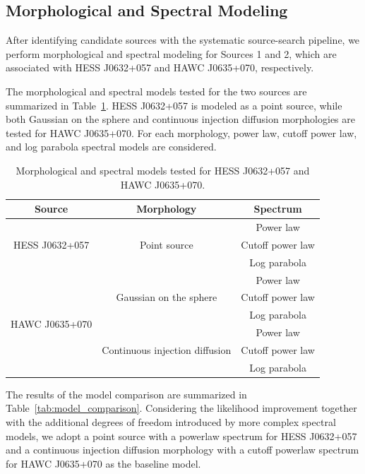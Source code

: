 \documentclass[10pt,letter]{article}
\begin{document}
\subsection{Morphological and Spectral Modeling}
After identifying candidate sources with the systematic source-search
pipeline, we perform morphological and spectral modeling for Sources 1
and 2, which are associated with HESS J0632+057 and HAWC J0635+070,
respectively.

The morphological and spectral models tested for the two sources are
summarized in Table~\ref{tab:tested_models}. HESS J0632+057 is modeled
as a point source, while both Gaussian on the sphere and continuous
injection diffusion morphologies are tested for HAWC J0635+070.
For each morphology, power law, cutoff power law, and log parabola
spectral models are considered.
\begin{table}[H]
\centering
\caption{Morphological and spectral models tested for HESS J0632+057
and HAWC J0635+070.}
\label{tab:tested_models}
\renewcommand{\arraystretch}{1.3}
\begin{tabular}{c|c|c}
\hline
\textbf{Source} & \textbf{Morphology} & \textbf{Spectrum} \\
\hline

\multirow{3}{*}{HESS J0632+057}
& \multirow{3}{*}{Point source}
& Power law \\
& & Cutoff power law \\
& & Log parabola \\
\hline

\multirow{6}{*}{HAWC J0635+070}
& \multirow{3}{*}{Gaussian on the sphere}
& Power law \\
& & Cutoff power law \\
& & Log parabola \\
\cline{2-3}

& \multirow{3}{*}{Continuous injection diffusion}
& Power law \\
& & Cutoff power law \\
& & Log parabola \\
\hline
\end{tabular}
\end{table}

The results of the model comparison are summarized in
Table~\ref{tab:model_comparison}. Considering the likelihood improvement together with the additional degrees of freedom introduced by more complex spectral models, we adopt a point source with a powerlaw spectrum for HESS J0632+057 and a continuous injection diffusion morphology with a cutoff powerlaw spectrum for HAWC J0635+070 as the baseline model.
\end{document}
